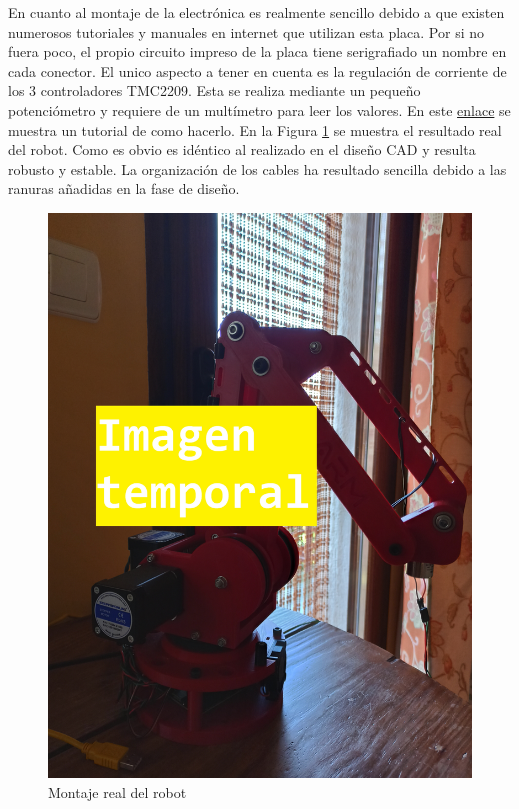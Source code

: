 En cuanto al montaje de la electrónica es realmente sencillo debido a que existen numerosos tutoriales 
y manuales en internet que utilizan esta placa. Por si no fuera poco, el propio circuito impreso de la 
placa tiene serigrafiado un nombre en cada conector. El unico aspecto a tener en cuenta es la regulación 
de corriente de los 3 controladores TMC2209. Esta se realiza mediante un pequeño potenciómetro y requiere 
de un multímetro para leer los valores. En este \href{https://all3dp.com/2/vref-calculator-tmc2209-tmc2208-a4988/}{enlace} se muestra un tutorial de como hacerlo.  
\newpage
En la Figura \ref{fig:montaje_real} se muestra el resultado real del robot. Como es obvio es idéntico al realizado en el diseño CAD y resulta robusto 
y estable. La organización de los cables ha resultado sencilla debido a las ranuras añadidas en la fase de diseño.
\begin{figure} [h!]
  \begin{center}
    \includegraphics[width=14cm]{figs/montaje_real.jpg}
  \end{center}
  \caption{Montaje real del robot}
  \label{fig:montaje_real}
  \end{figure}\ 